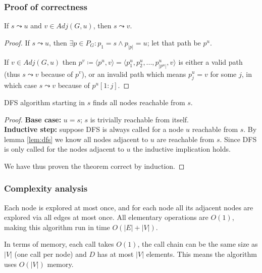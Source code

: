\subsubsection{Proof of correctness}
\begin{lemma} \label{lem:dfs}
    If $s \leadsto u$ and $v \in Adj(G, u)$, then $s \leadsto v$.
\end{lemma}
\begin{proof}
    If $s \leadsto u$, then $\exists p \in P_G \colon p_1 = s \wedge p_{|p|} = u$; let that path be $p^u$.\par
    If $v \in Adj(G, u)$ then $p^v \coloneqq \langle p^u, v \rangle = \langle p^u_1, p^u_2,...,p^u_{|p^u|}, v\rangle$ is either a valid path (thus $s \leadsto v$ because of $p^v$), or an invalid path which means $p^u_j = v$ for some $j$, in which case $s \leadsto v$ because of $p^u[1:j]$.
\end{proof}
\begin{theorem}
    \Acrlong*{DFS} algorithm starting in $s$ finds all nodes reachable from $s$.
\end{theorem}
\begin{proof} \textbf{Base case:} $u=s$; $s$ is trivially reachable from itself. \\
\textbf{Inductive step:} suppose \textsc{DFS} is always called for a node $u$ reachable from $s$. By lemma \ref{lem:dfs} we know all nodes adjacent to $u$ are reachable from $s$. Since \textsc{DFS} is only called for the nodes adjacent to $u$ the inductive implication holds.\par
We have thus proven the theorem correct by induction.
\end{proof}
\subsubsection{Complexity analysis}
Each node is explored at most once, and for each node all its adjacent nodes are explored via all edges at most once. All elementary operations are $O(1)$, making this algorithm run in time $O(|E|+|V|)$.\par
In terms of memory, each call takes $O(1)$, the call chain can be the same size as $|V|$ (one call per node) and $D$ has at most $|V|$ elements. This means the algorithm uses $O(|V|)$ memory.
